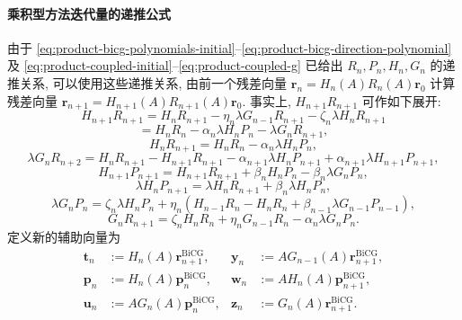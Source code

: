 \paragraph{{乘积型方法迭代量的递推公式}}\label{subsec:product-iterate-recurrences}\mbox{}\par
{由于 \eqref{eq:product-bicg-polynomials-initial}--\eqref{eq:product-bicg-direction-polynomial} 及 \eqref{eq:product-coupled-initial}--\eqref{eq:product-coupled-g} 已给出 $R_n,P_n,H_n,G_n$ 的递推关系, 可以使用这些递推关系, 由前一个残差向量 $\bm r_n=H_n(A)R_n(A)\bm r_0$ 计算残差向量 $\bm r_{n+1}=H_{n+1}(A)R_{n+1}(A)\bm r_0$. 事实上, $H_{n+1}R_{n+1}$ 可作如下展开:}
\begin{equation}\label{eq:product-polynomial-residual-three}H_{n+1}R_{n+1}=H_nR_{n+1}-\eta_n\lambda G_{n-1}R_{n+1}-\zeta_n\lambda H_nR_{n+1}\end{equation}
\begin{equation}\label{eq:product-polynomial-residual-two}=H_nR_n-\alpha_n\lambda H_nP_n-\lambda G_nR_{n+1},\end{equation}
\begin{equation}\label{eq:product-polynomial-t}H_nR_{n+1}=H_nR_n-\alpha_n\lambda H_nP_n,\end{equation}
\begin{equation}\label{eq:product-polynomial-y}\lambda G_nR_{n+2}=H_nR_{n+1}-H_{n+1}R_{n+1}-\alpha_{n+1}\lambda H_nP_{n+1}+\alpha_{n+1}\lambda H_{n+1}P_{n+1},\end{equation}
\begin{equation}\label{eq:product-polynomial-p}H_{n+1}P_{n+1}=H_{n+1}R_{n+1}+\beta_nH_nP_n-\beta_n\lambda G_nP_n,\end{equation}
\begin{equation}\label{eq:product-polynomial-w}\lambda H_nP_{n+1}=\lambda H_nR_{n+1}+\beta_n\lambda H_nP_n,\end{equation}
\begin{equation}\label{eq:product-polynomial-u}\lambda G_nP_n=\zeta_n\lambda H_nP_n+\eta_n(H_{n-1}R_n-H_nR_n+\beta_{n-1}\lambda G_{n-1}P_{n-1}),\end{equation}
\begin{equation}\label{eq:product-polynomial-z}G_nR_{n+1}=\zeta_nH_nR_n+\eta_nG_{n-1}R_n-\alpha_n\lambda G_nP_n.\end{equation}
{定义新的辅助向量为}
\[\begin{aligned}\bm t_n&:=H_n(A)\bm r_{n+1}^{\mathrm{BiCG}},&\bm y_n&:=AG_{n-1}(A)\bm r_{n+1}^{\mathrm{BiCG}},\\\bm p_n&:=H_n(A)\bm p_n^{\mathrm{BiCG}},&\bm w_n&:=AH_n(A)\bm p_{n+1}^{\mathrm{BiCG}},\\\bm u_n&:=AG_n(A)\bm p_n^{\mathrm{BiCG}},&\bm z_n&:=G_n(A)\bm r_{n+1}^{\mathrm{BiCG}}.\end{aligned}\]

